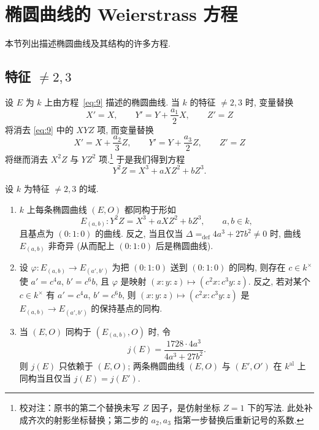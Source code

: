 \section{椭圆曲线的 Weierstrass 方程}\label{sec:2.2}

本节列出描述椭圆曲线及其结构的许多方程.

\subsection*{特征 $\neq 2, 3$}

设 $E$ 为 $k$ 上由方程~\eqref{eq:9} 描述的椭圆曲线. 当 $k$ 的特征 $\neq 2, 3$ 时, 变量替换
\[
X' = X, \qquad Y' = Y + \frac{a_1}{2}X, \qquad Z' = Z
\]
将消去 \eqref{eq:9} 中的 $XYZ$ 项, 而变量替换
\[
X' = X + \frac{a_2}{3}Z, \qquad Y' = Y + \frac{a_3}{2}Z, \qquad Z' = Z
\]
将继而消去 $X^2Z$ 与 $YZ^2$ 项.\footnote{校对注：原书的第二个替换未写 $Z$ 因子，是仿射坐标 $Z=1$ 下的写法. 此处补成齐次的射影坐标替换；第二步的 $a_2,a_3$ 指第一步替换后重新记号的系数.} 于是我们得到方程
\[
Y^2Z = X^3 + aXZ^2 + bZ^3.
\]

\begin{theorem} \label{thm:2.2.1} 
设 $k$ 为特征 $\neq 2, 3$ 的域.
\begin{enumerate}[label=\textup{(\alph*)}]
\item $k$ 上每条椭圆曲线 $(E,O)$ 都同构于形如
\[
E_{(a,b)}\colon Y^2Z = X^3 + aXZ^2 + bZ^3, \qquad a,b\in k,
\]
且基点为 $(0:1:0)$ 的曲线. 反之, 当且仅当 $\Delta \mathrel{=_{\mathrm{def}}} 4a^3 + 27b^2\neq 0$ 时, 曲线 $E_{(a,b)}$ 非奇异 (从而配上 $(0:1:0)$ 后是椭圆曲线).
\item 设 $\varphi\colon E_{(a,b)}\to E_{(a',b')}$ 为把 $(0:1:0)$ 送到 $(0:1:0)$ 的同构, 则存在 $c\in k^{\times}$ 使 $a' = c^4a$, $b' = c^6b$, 且 $\varphi$ 是映射 $(x:y:z)\mapsto(c^2x:c^3y:z)$. 反之, 若对某个 $c\in k^{\times}$ 有 $a' = c^4a$, $b' = c^6b$, 则 $(x:y:z)\mapsto(c^2x:c^3y:z)$ 是 $E_{(a,b)}\to E_{(a',b')}$ 的保持基点的同构.
\item 当 $(E,O)$ 同构于 $(E_{(a,b)}, O)$ 时, 令
\[
j(E) = \frac{1728\cdot 4a^3}{4a^3 + 27b^2}.
\]
则 $j(E)$ 只依赖于 $(E,O)$; 两条椭圆曲线 $(E,O)$ 与 $(E',O')$ 在 $k^{\mathrm{al}}$ 上同构当且仅当 $j(E) = j(E')$.
\end{enumerate}
\end{theorem}

